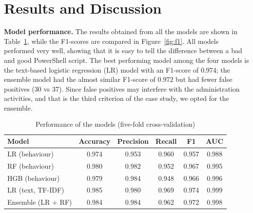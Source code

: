 \documentclass[12pt,a4paper]{article}
\newcommand{\head}[1]{\noindent\textbf{#1}\quad}
\begin{document}
\section{Results and Discussion}
\head{Model performance.} The results obtained from all the models are shown in Table~\ref{tab:results}, while the F1-scores are compared in Figure~\ref{fig:f1}. All models performed very well, showing that it is easy to tell the difference between a bad and good PowerShell script. The best performing model among the four models is the text-based logistic regression (LR) model with an F1-score of 0.974; the ensemble model had the almost similar F1-score of 0.972 but had fewer false positives (30 vs 37). Since false positives may interfere with the administration activities, and that is the third criterion of the case study, we opted for the ensemble.

\begin{table}[htbp]
\centering
\caption{Performance of the models (five-fold cross-validation)}\label{tab:results}
\begin{tabular}{lccccc}
\toprule
\textbf{Model} & \textbf{Accuracy} & \textbf{Precision} & \textbf{Recall} & \textbf{F1} & \textbf{AUC}\\
\midrule
LR (behaviour)        & 0.974 & 0.953 & 0.960 & 0.957 & 0.988\\
RF (behaviour)        & 0.980 & 0.982 & 0.952 & 0.967 & 0.995\\
HGB (behaviour)       & 0.979 & 0.984 & 0.948 & 0.966 & 0.996\\
LR (text, TF-IDF)     & 0.985 & 0.980 & 0.969 & 0.974 & 0.999\\
Ensemble (LR + RF)    & 0.984 & 0.984 & 0.962 & 0.972 & 0.998\\
\bottomrule
\end{tabular}
\end{table}
\end{document}
